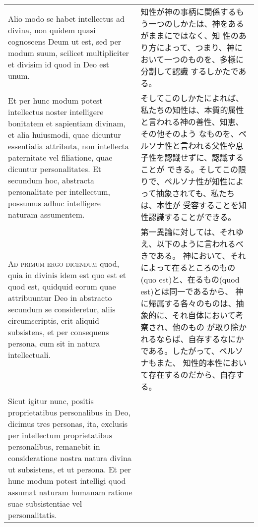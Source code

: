 \documentclass[10pt]{jsarticle} %
\begin{document}
\begin{longtable}{p{21em}p{21em}}
\\


Alio modo se habet intellectus ad divina, non
quidem quasi cognoscens Deum ut est, sed per modum suum, scilicet
multipliciter et divisim id quod in Deo est unum. 


&

知性が神の事柄に関係するもう一つのしかたは、神をあるがままにではなく、知
 性のあり方によって、つまり、神において一つのものを、多様に分割して認識
 するしかたである。


\\

Et per hunc modum
potest intellectus noster intelligere bonitatem et sapientiam divinam,
et alia huiusmodi, quae dicuntur essentialia attributa, non intellecta
paternitate vel filiatione, quae dicuntur personalitates. Et secundum
hoc, abstracta personalitate per intellectum, possumus adhuc intelligere
naturam assumentem.


&

そしてこのしかたによれば、私たちの知性は、本質的属性と言われる神の善性、知恵、その他そのよう
 なものを、ペルソナ性と言われる父性や息子性を認識せずに、認識することが
 できる。そしてこの限りで、ペルソナ性が知性によって抽象されても、私たち
 は、本性が
 受容することを知性認識することができる。

\\



{\scshape Ad primum ergo dicendum} quod, quia in divinis idem est quo est et quod
est, quidquid eorum quae attribuuntur Deo in abstracto secundum se
consideretur, aliis circumscriptis, erit aliquid subsistens, et per
consequens persona, cum sit in natura intellectuali. 


&

第一異論に対しては、それゆえ、以下のように言われるべきである。
神において、それによって在るところのもの(quo est)と、在るもの(quod est)とは同一であるから、
 神に帰属する各々のものは、抽象的に、それ自体において考察され、他のもの
 が取り除かれるならば、自存するなにかである。したがって、ペルソナもまた、
 知性的本性において存在するのだから、自存する。

\\


Sicut igitur nunc,
positis proprietatibus personalibus in Deo, dicimus tres personas, ita,
exclusis per intellectum proprietatibus personalibus, remanebit in
consideratione nostra natura divina ut subsistens, et ut persona. Et per
hunc modum potest intelligi quod assumat naturam humanam ratione suae
subsistentiae vel personalitatis.



\end{longtable}
\end{document}
